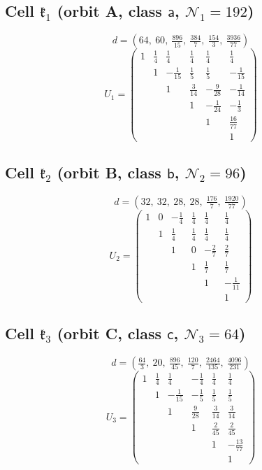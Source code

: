 \documentclass[11pt,reqno]{amsart}
\renewcommand{\_}{\origunderscore\allowbreak}
\numberwithin{equation}{section}
\theoremstyle{plain}
\theoremstyle{definition}
\theoremstyle{remark}
\newcommand{\Cell}[1]{\mathfrak{k}_{#1}}     %
\newcommand{\norm}[1]{\mathcal{N}_{#1}}      %
\begin{document}
\subsection*{Cell \texorpdfstring{$\Cell1$}{C001} (orbit A, class \(\mathsf a\), \(\norm1=192\))}
\[
d=\left(64,\ 60,\ \tfrac{896}{15},\ \tfrac{384}{7},\ \tfrac{154}{3},\ \tfrac{3936}{77}\right)
\]
\[
U_1=\begin{pmatrix}
1 & \tfrac14 & \tfrac14 & \tfrac14 & \tfrac14 & \tfrac14\\
 & 1 & -\tfrac1{15} & \tfrac15 & \tfrac15 & -\tfrac1{15}\\
 & & 1 & \tfrac3{14} & -\tfrac9{28} & -\tfrac1{14}\\
 & & & 1 & -\tfrac1{24} & -\tfrac13\\
 & & & & 1 & \tfrac{16}{77}\\
 & & & & & 1
\end{pmatrix}
\]

\subsection*{Cell \texorpdfstring{$\Cell2$}{C002} (orbit B, class \(\mathsf b\), \(\norm2=96\))}
\[
d=\left(32,\ 32,\ 28,\ 28,\ \tfrac{176}{7},\ \tfrac{1920}{77}\right)
\]
\[
U_2=\begin{pmatrix}
1 & 0 & -\tfrac14 & \tfrac14 & \tfrac14 & \tfrac14\\
 & 1 & \tfrac14 & \tfrac14 & \tfrac14 & \tfrac14\\
 & & 1 & 0 & -\tfrac27 & \tfrac27\\
 & & & 1 & \tfrac17 & \tfrac17\\
 & & & & 1 & -\tfrac1{11}\\
 & & & & & 1
\end{pmatrix}
\]

\subsection*{Cell \texorpdfstring{$\Cell3$}{C003} (orbit C, class \(\mathsf c\), \(\norm3=64\))}
\[
d=\left(\tfrac{64}{3},\ 20,\ \tfrac{896}{45},\ \tfrac{120}{7},\ \tfrac{2464}{135},\ \tfrac{4096}{231}\right)
\]
\[
U_3=\begin{pmatrix}
1 & \tfrac14 & \tfrac14 & -\tfrac14 & \tfrac14 & \tfrac14\\
 & 1 & -\tfrac1{15} & -\tfrac15 & \tfrac15 & \tfrac15\\
 & & 1 & \tfrac9{28} & \tfrac3{14} & \tfrac3{14}\\
 & & & 1 & \tfrac2{45} & \tfrac2{45}\\
 & & & & 1 & -\tfrac{13}{77}\\
 & & & & & 1
\end{pmatrix}
\]
\end{document}
